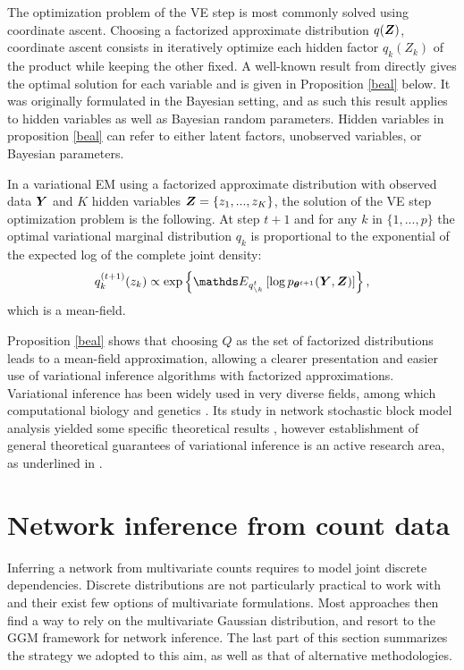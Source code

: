The optimization problem of the VE step is most commonly solved using coordinate ascent. Choosing a factorized approximate distribution $q({\boldsymbol{Z}})$, coordinate ascent consists in iteratively optimize each hidden factor $q_k(Z_k)$ of the product while keeping the other fixed. A well-known result from \citet{beal} directly gives the optimal solution for each variable and is given in Proposition \ref{beal} below. It was originally formulated in the Bayesian setting, and as such this result applies to hidden variables as well as Bayesian random parameters. Hidden variables in proposition \ref{beal} can refer to either latent factors, unobserved variables, or Bayesian parameters.

 \begin{prop}\label{beal}
In a variational EM using a factorized approximate distribution with observed data ${\boldsymbol{Y}}$ and $K$ hidden variables ${\boldsymbol{Z}}=\{z_1,...,z_K\}$, the solution of the VE step optimization problem is the following. At step $t+1$ and for any $k$ in $\{1,...,p\}$ the optimal variational marginal distribution $q_k$ is proportional to the exponential of the expected log of the complete joint density:
$$ q_k^{(t+1)}(z_k)  \propto \exp \left\{ \Esp_{q_{\setminus k}^t} \left[ \log p_{\thetabf^{t+1}}(\Ybf, \Zbf) \right] \right\},$$
which is a mean-field.
\end{prop}

Proposition \ref{beal} shows that choosing $Q$ as the set of factorized distributions leads to a mean-field approximation, allowing a clearer presentation and easier use of variational inference algorithms with factorized approximations. Variational inference has been widely used in very diverse fields, among which computational biology and genetics \citep{CS12,RSP14}. Its study in network stochastic block model analysis yielded some specific theoretical results \citep{CDP12,BCC13}, however establishment of general theoretical guarantees of variational inference is an active research area, as underlined in \citet{BKM17}. 

\section{Network inference from count data}
 Inferring a network  from multivariate counts requires to model joint discrete dependencies. Discrete distributions are not particularly practical to work with and their exist few options of multivariate formulations.  Most approaches then find a way to rely on the multivariate Gaussian distribution, and resort to the GGM framework for network inference. The last part of this section summarizes the strategy we adopted to this aim, as well as that of alternative methodologies.
  

